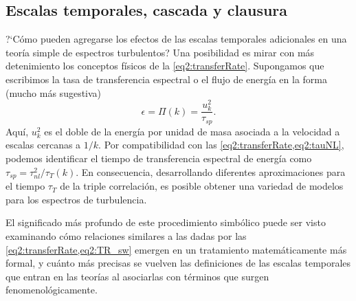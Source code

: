 \subsection{Escalas temporales, cascada y clausura}

?`Cómo pueden agregarse los efectos de las escalas temporales
adicionales en una teoría simple de espectros turbulentos? Una
posibilidad es mirar con más detenimiento los conceptos físicos de la
\cref{eq2:transferRate}. Supongamos que escribimos la tasa de
transferencia espectral o el flujo de energía en la forma (mucho más
sugestiva)
\begin{equation}\label{eq2:TR_sw}
  \epsilon = \Pi(k) = \frac{u_k^2}{\tau_{sp}}.
\end{equation}
Aquí, $u_k^2$ es el doble de la energía por unidad de masa asociada a
la velocidad a escalas cercanas a $1/k$. Por compatibilidad con las
\cref{eq2:transferRate,eq2:tauNL}, podemos identificar el tiempo de
transferencia espectral de energía como $\tau_{sp}
= \tau_{nl}^2/\tau_T(k)$. En consecuencia, desarrollando diferentes
aproximaciones para el tiempo $\tau_T$ de la triple correlación, es
posible obtener una variedad de modelos para los espectros de
turbulencia.

El significado más profundo de este procedimiento simbólico puede ser
visto examinando cómo relaciones similares a las dadas por las
\cref{eq2:transferRate,eq2:TR_sw} emergen en un tratamiento
matemáticamente más formal, y cuánto más precisas se vuelven las
definiciones de las escalas temporales que entran en las teorías al
asociarlas con términos que surgen fenomenológicamente.

